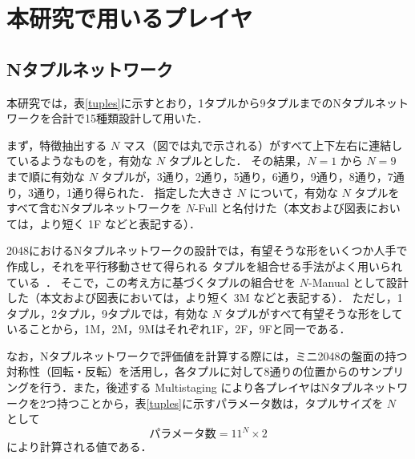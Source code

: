 \section{本研究で用いるプレイヤ}
\subsection{Nタプルネットワーク}
\label{sec:Ntuple}


本研究では，表\ref{tuples}に示すとおり，1タプルから9タプルまでのNタプルネットワークを合計で15種類設計して用いた．

まず，特徴抽出する $N$ マス（図では丸で示される）がすべて上下左右に連結しているようなものを，有効な $N$ タプルとした．
その結果，$N=1$ から $N=9$ まで順に有効な $N$ タプルが，3通り，2通り，5通り，6通り，9通り，8通り，7通り，3通り，1通り得られた．
指定した大きさ $N$ について，有効な $N$ タプルをすべて含むNタプルネットワークを $N$-Full と名付けた（本文および図表においては，より短く \textsf{1F} などと表記する）．

2048におけるNタプルネットワークの設計では，有望そうな形をいくつか人手で作成し，それを平行移動させて得られる
タプルを組合せる手法がよく用いられている~\cite{SzJa14,YWHC16,Jask17}．
そこで，この考え方に基づくタプルの組合せを $N$-Manual として設計した（本文および図表においては，より短く \textsf{3M} などと表記する）．
ただし，1タプル，2タプル，9タプルでは，有効な $N$ タプルがすべて有望そうな形をしていることから，\textsf{1M}，\textsf{2M}，\textsf{9M}はそれぞれ\textsf{1F}，\textsf{2F}，\textsf{9F}と同一である．

なお，Nタプルネットワークで評価値を計算する際には，ミニ2048の盤面の持つ対称性（回転・反転）を活用し，各タプルに対して8通りの位置からのサンプリングを行う．また，後述する Multistaging により各プレイヤはNタプルネットワークを2つ持つことから，表\ref{tuples}に示すパラメータ数は，タプルサイズを $N$ として
\[
 \mbox{パラメータ数} = 11^N \times 2
\]
により計算される値である．

